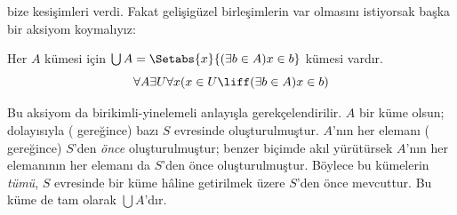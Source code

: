 \documentclass[../../../include/open-logic-section]{subfiles}
\begin{document}

 bize kesişimleri verdi.
Fakat gelişigüzel birleşimlerin var olmasını istiyorsak başka bir aksiyom
koymalıyız:

\begin{axiom}[Birleşim] Her $A$ kümesi için
$\bigcup A=\Setabs{x}{(\exists b\in A)x\in b}$ kümesi vardır.
\[
  \forall A \exists U \forall x(x \in U \liff (\exists b \in A)x \in b)
\]
\end{axiom}

Bu aksiyom da birikimli-yinelemeli anlayışla gerekçelendirilir. $A$ bir küme
olsun; dolayısıyla (\stageshier{} gereğince) bazı $S$ evresinde
oluşturulmuştur. $A$'nın her elemanı (\stagesacc{} gereğince) $S$'den
\emph{önce} oluşturulmuştur; benzer biçimde akıl yürütürsek $A$'nın her
elemanının her elemanı da $S$'den önce oluşturulmuştur. Böylece bu kümelerin
\emph{tümü}, $S$ evresinde bir küme hâline getirilmek üzere $S$'den önce
mevcuttur. Bu küme de tam olarak $\bigcup A$'dır.
\end{document}
